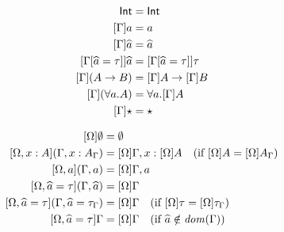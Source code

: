 \begin{mdef}
  \label{fig:ctxt:extension}
\end{mdef}

\begin{mdef}
  \begin{align*}
    [\Gamma]\nat & = \nat \\
    [\Gamma]a &= a \\
    [\Gamma]\genA &= \genA \\
    [\Gamma[\genA = \tau]]\genA &= [\Gamma[\genA = \tau]]\tau \\
    [\Gamma](A \to B) &= [\Gamma]A \to [\Gamma]B \\
    [\Gamma](\forall a. A) &= \forall a. [\Gamma]A \\
    [\Gamma]\unknown &= \unknown
  \end{align*}
\end{mdef}

\begin{mdef}
  \begin{align*}
    \ctxsubst{\Omega}{\emptyset} &= \emptyset \\
    \ctxsubst{\Omega, x : A}{(\Gamma, x : A_{\Gamma})} &= \ctxsubst{\Omega}{\Gamma}, x : \ctxsubst{\Omega}{A} \quad (\text{if $\ctxsubst{\Omega}{A} = \ctxsubst{\Omega}{A_\Gamma}$}) \\
    \ctxsubst{\Omega, a}{(\Gamma, a)} &= \ctxsubst{\Omega}{\Gamma}, a \\
    \ctxsubst{\Omega, \genA = \tau}{(\Gamma, \genA)} &= \ctxsubst{\Omega}{\Gamma} \\
    \ctxsubst{\Omega, \genA = \tau}{(\Gamma, \genA = \tau_\Gamma)} &= \ctxsubst{\Omega}{\Gamma} \quad (\text{if $\ctxsubst{\Omega}{\tau} = \ctxsubst{\Omega}{\tau_\Gamma}$}) \\
    \ctxsubst{\Omega, \genA = \tau}{\Gamma} &= \ctxsubst{\Omega}{\Gamma} \quad (\text{if $\genA \notin \mathit{dom}(\Gamma)$})
  \end{align*}
\end{mdef}

